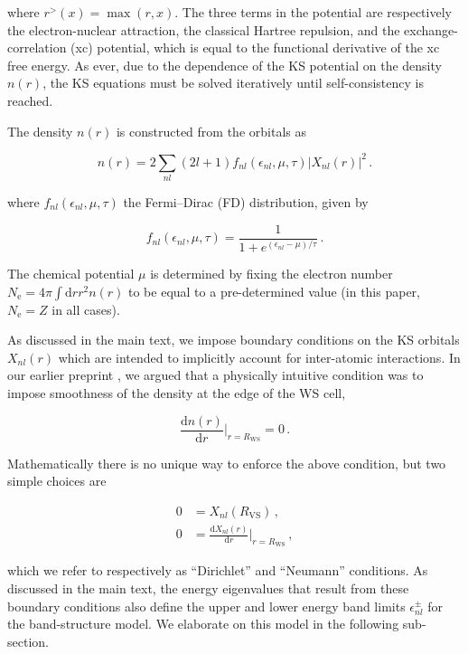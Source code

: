 \documentclass[9pt]{article}
\begin{document}
where \(r^>(x)=\max(r,x)\). The three terms in the potential are
respectively the electron-nuclear attraction, the classical Hartree
repulsion, and the exchange-correlation (xc) potential, which is equal
to the functional derivative of the xc free energy. As ever, due to the
dependence of the KS potential on the density \(n(r)\), the KS equations
must be solved iteratively until self-consistency is reached.

The density \(n(r)\) is constructed from the orbitals as

\begin{equation}
n(r) = 2\sum_{nl}(2l+1) f_{nl}(\epsilon_{nl},\mu,\tau) |X_{nl}(r)|^2\,.
\end{equation}

where \(f_{nl}(\epsilon_{nl},\mu,\tau)\) the Fermi--Dirac (FD)
distribution, given by

\begin{equation}
f_{nl}(\epsilon_{nl},\mu,\tau) = \frac{1}{1+e^{(\epsilon_{nl}-\mu)/\tau}}\,.
\end{equation}

The chemical potential \(\mu\) is determined by fixing the electron
number \(N_\textrm{e}=4\pi\int\textrm{d}r r^2 n(r)\) to be equal to a
pre-determined value (in this paper, \(N_\textrm{e}=Z\) in all cases).

As discussed in the main text, we impose boundary conditions on the KS
orbitals \(X_{nl}(r)\) which are intended to implicitly account for
inter-atomic interactions. In our earlier preprint
\cite{callow2021firstprinciples}, we argued that a physically intuitive
condition was to impose smoothness of the density at the edge of the WS
cell,

\begin{equation}
\frac{\textrm{d}n(r)}{\textrm{d}r}\Bigg|_{r=R_\textrm{WS}} =0\,.
\end{equation}

Mathematically there is no unique way to enforce the above condition,
but two simple choices are

\begin{align}
0&=X_{nl}(R_\textrm{VS})\,, \\
0&=\frac{\textrm{d}X_{nl}(r)}{\textrm{d}r}\Bigg|_{r=R_\textrm{WS}}\,,
\end{align}

which we refer to respectively as ``Dirichlet'' and ``Neumann''
conditions. As discussed in the main text, the energy eigenvalues that
result from these boundary conditions also define the upper and lower
energy band limits \(\epsilon^{\pm}_{nl}\) for the band-structure model.
We elaborate on this model in the following sub-section.
\end{document}
